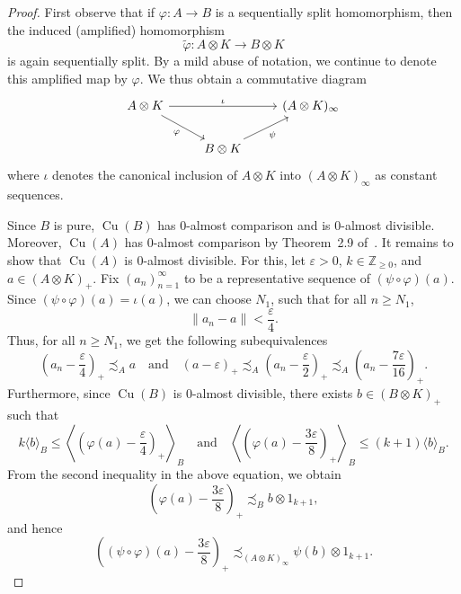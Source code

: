 \documentclass[10pt]{amsart}
\numberwithin{equation}{section}
\theoremstyle{definition}
\newcommand{\ep}{\varepsilon}
\newcommand{\ph}{\varphi}
\newcommand{\ps}{\psi}
\newcommand{\Nz}{{\mathbb{Z}}_{\geq 0}}
\newcommand{\Cu}{{\operatorname{Cu}}}
\newcommand{\cc}[1]{\langle #1 \rangle}
\newcommand{\inn}[1]{\left\langle #1 \right\rangle}
\begin{document}
\begin{proof}
First observe that if $\varphi \colon A \to B$ is a sequentially split homomorphism, then the induced (amplified) homomorphism
\[
\tilde{\varphi} \colon A \otimes K \to B \otimes K
\]
is again sequentially split. By a mild abuse of notation, we continue to denote this amplified map by $\varphi$. We thus obtain a commutative diagram
\[ \begin{tikzcd} A \otimes K \arrow[rr, "\iota"] \arrow[dr, "\ph"'] & & (A \otimes K )_\infty\\ & B \otimes K \arrow[ur, "\ps" ' ] & \end{tikzcd} \]
where $\iota$ denotes the canonical inclusion of $A \otimes K$ into $(A \otimes K)_\infty$ as constant sequences.

Since $B$ is pure, $\Cu(B)$ has $0$-almost comparison and is $0$-almost divisible. Moreover, $\Cu(A)$ has $0$-almost comparison by Theorem~2.9 of~\cite{barlak}. It remains to show that $\Cu(A)$ is $0$-almost divisible. For this, let
$\ep > 0$, $k\in \Nz$, and $a\in (A \otimes K)_+$. Fix
$\left( a_n\right)_{n=1}^\infty$ to be a representative
sequence of $(\ps \circ \ph) (a)$. Since
$(\ps \circ \ph) (a) = \iota (a)$, we can choose $N_1$,
such that for all $n \geq N_1$,
\begin{equation*}
\| a_n - a\| < \frac{\ep}{4}.
\end{equation*}
Thus, for all $n \geq N_1$, we get the following subequivalences
\begin{equation}\label{0104_divisibility_seq}
\left( a_n - \frac{\ep}{4}\right)_+ \precsim_A a\quad\text{and}\quad (a- \ep)_+ \precsim_A \left(a_n -\frac{\ep}{2}\right)_+ \precsim_A \left(a_n - \frac{7\ep}{16} \right)_+.
\end{equation}
Furthermore, since $\Cu(B)$ is $0$-almost divisible, there exists $b \in (B \otimes K)_+$ such that
\begin{equation}\label{0104_divisibility_seq_split}
k \cc{b}_B \leq \inn{\left(\ph(a)-\frac{\ep}{4}\right)_+}_B\quad\text{and}\quad \inn{\left(\ph(a)-\frac{3\ep}{8}\right)_+}_B \leq (k+1) \cc{b}_B.
\end{equation}
From the second inequality in the above equation, we obtain
\begin{equation*}
\left(\ph(a)-\frac{3\ep}{8}\right)_+\precsim_B b \otimes 1_{k+1},
\end{equation*}
and hence
\begin{equation*}
\left((\ps \circ \ph)(a)-\frac{3\ep}{8}\right)_+\precsim_{{(A \otimes K)}_\infty} \ps(b) \otimes 1_{k+1}.

\end{equation*}
\end{proof}
\end{document}
